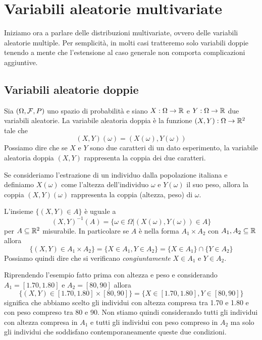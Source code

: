 \chapter{Variabili aleatorie multivariate}
Iniziamo ora a parlare delle distribuzioni multivariate, ovvero delle variabili aleatorie
multiple. Per semplicità, in molti casi tratteremo solo variabili doppie tenendo a mente che
l'estensione al caso generale non comporta complicazioni aggiuntive.

\section{Variabili aleatorie doppie}
Sia $(\Omega, \mathcal{F}, P)$ uno spazio di probabilità e siano $X : \Omega \to \mathbb{R}$ e $Y : \Omega \to \mathbb{R}$
due variabili aleatorie. La variabile aleatoria doppia è la funzione $(X, Y) : \Omega \to \mathbb{R}^2$
tale che
\[ (X, Y)(\omega) = (X(\omega), Y(\omega)) \]
Possiamo dire che se $X$ e $Y$ sono due caratteri di un dato esperimento, la variabile aleatoria
doppia $(X, Y)$ rappresenta la coppia dei due caratteri.

\begin{example}
	Se consideriamo l'estrazione di un individuo dalla popolazione italiana e definiamo $X(\omega)$
	come l'altezza dell'individuo $\omega$ e $Y(\omega)$ il suo peso, allora la coppia
	$(X, Y)(\omega)$ rappresenta la coppia (altezza, peso) di $\omega$.
\end{example}

L'insieme $\{ (X, Y) \in A \}$ è uguale a
\[ (X, Y)^{-1} (A) = \{ \omega \in \Omega | (X(\omega), Y(\omega)) \in A \} \]
per $A \subseteq \mathbb{R}^2$ misurabile. In particolare se $A$ è nella forma $A_1 \times A_2$ con
$A_1, A_2 \subseteq \mathbb{R}$ allora
\[
	\{ (X, Y) \in A_1 \times A_2 \} = \{ X \in A_1, Y \in A_2 \} =
	\{ X \in A_1 \} \cap \{ Y \in A_2 \}
\]
Possiamo quindi dire che si verificano \emph{congiuntamente} $X \in A_1$ e $Y \in A_2$.

\begin{example}
	Riprendendo l'esempio fatto prima con altezza e peso e considerando $A_1 = [1.70, 1.80]$ e
	$A_2 = [80, 90]$ allora
	\[ \{ (X, Y) \in [1.70, 1.80] \times [80, 90] \} = \{ X \in [1.70, 1.80], Y \in [80, 90] \} \]
	significa che abbiamo scelto gli individui con altezza compresa tra 1.70 e 1.80 e con peso
	compreso tra 80 e 90. Non stiamo quindi considerando tutti gli individui con altezza compresa
	in $A_1$ e tutti gli individui con peso compreso in $A_2$ ma solo gli individui che soddisfano
	contemporaneamente queste due condizioni.
\end{example}

